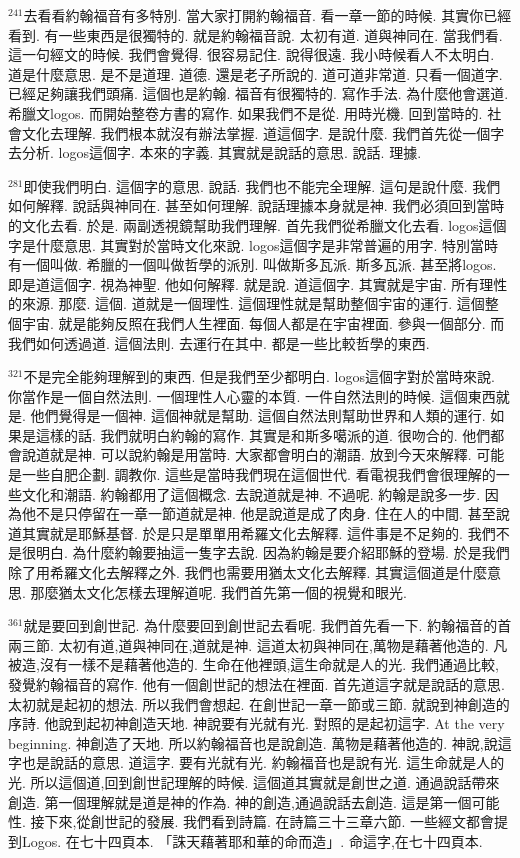 \documentclass{book}
\begin{document}
$^{241}$去看看約翰福音有多特別.
當大家打開約翰福音.
看一章一節的時候.
其實你已經看到.
有一些東西是很獨特的.
就是約翰福音說.
太初有道.
道與神同在.
當我們看.
這一句經文的時候.
我們會覺得.
很容易記住.
說得很遠.
我小時候看人不太明白.
道是什麼意思.
是不是道理.
道德.
還是老子所說的.
道可道非常道.
只看一個道字.
已經足夠讓我們頭痛.
這個也是約翰.
福音有很獨特的.
寫作手法.
為什麼他會選道.
希臘文logos.
而開始整卷方書的寫作.
如果我們不是從.
用時光機.
回到當時的.
社會文化去理解.
我們根本就沒有辦法掌握.
道這個字.
是說什麼.
我們首先從一個字去分析.
logos這個字.
本來的字義.
其實就是說話的意思.
說話.
理據.

$^{281}$即使我們明白.
這個字的意思.
說話.
我們也不能完全理解.
這句是說什麼.
我們如何解釋.
說話與神同在.
甚至如何理解.
說話理據本身就是神.
我們必須回到當時的文化去看.
於是.
兩副透視鏡幫助我們理解.
首先我們從希臘文化去看.
logos這個字是什麼意思.
其實對於當時文化來說.
logos這個字是非常普遍的用字.
特別當時有一個叫做.
希臘的一個叫做哲學的派別.
叫做斯多瓦派.
斯多瓦派.
甚至將logos.
即是道這個字.
視為神聖.
他如何解釋.
就是說.
道這個字.
其實就是宇宙.
所有理性的來源.
那麼.
這個.
道就是一個理性.
這個理性就是幫助整個宇宙的運行.
這個整個宇宙.
就是能夠反照在我們人生裡面.
每個人都是在宇宙裡面.
參與一個部分.
而我們如何透過道.
這個法則.
去運行在其中.
都是一些比較哲學的東西.

$^{321}$不是完全能夠理解到的東西.
但是我們至少都明白.
logos這個字對於當時來說.
你當作是一個自然法則.
一個理性人心靈的本質.
一件自然法則的時候.
這個東西就是.
他們覺得是一個神.
這個神就是幫助.
這個自然法則幫助世界和人類的運行.
如果是這樣的話.
我們就明白約翰的寫作.
其實是和斯多噶派的道.
很吻合的.
他們都會說道就是神.
可以說約翰是用當時.
大家都會明白的潮語.
放到今天來解釋.
可能是一些自肥企劃.
調教你.
這些是當時我們現在這個世代.
看電視我們會很理解的一些文化和潮語.
約翰都用了這個概念.
去說道就是神.
不過呢.
約翰是說多一步.
因為他不是只停留在一章一節道就是神.
他是說道是成了肉身.
住在人的中間.
甚至說道其實就是耶穌基督.
於是只是單單用希羅文化去解釋.
這件事是不足夠的.
我們不是很明白.
為什麼約翰要抽這一隻字去說.
因為約翰是要介紹耶穌的登場.
於是我們除了用希羅文化去解釋之外.
我們也需要用猶太文化去解釋.
其實這個道是什麼意思.
那麼猶太文化怎樣去理解道呢.
我們首先第一個的視覺和眼光.

$^{361}$就是要回到創世記.
為什麼要回到創世記去看呢.
我們首先看一下.
約翰福音的首兩三節.
太初有道,道與神同在,道就是神.
這道太初與神同在,萬物是藉著他造的.
凡被造,沒有一樣不是藉著他造的.
生命在他裡頭,這生命就是人的光.
我們通過比較,發覺約翰福音的寫作.
他有一個創世記的想法在裡面.
首先道這字就是說話的意思.
太初就是起初的想法.
所以我們會想起.
在創世記一章一節或三節.
就說到神創造的序詩.
他說到起初神創造天地.
神說要有光就有光.
對照的是起初這字.
At the very beginning.
神創造了天地.
所以約翰福音也是說創造.
萬物是藉著他造的.
神說,說這字也是說話的意思.
道這字.
要有光就有光.
約翰福音也是說有光.
這生命就是人的光.
所以這個道,回到創世記理解的時候.
這個道其實就是創世之道.
通過說話帶來創造.
第一個理解就是道是神的作為.
神的創造,通過說話去創造.
這是第一個可能性.
接下來,從創世記的發展.
我們看到詩篇.
在詩篇三十三章六節.
一些經文都會提到Logos.
在七十四頁本.
「誅天藉著耶和華的命而造」.
命這字,在七十四頁本.
\end{document}
